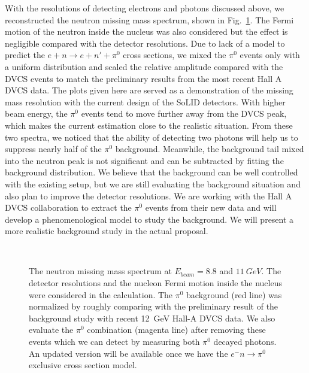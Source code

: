 With the resolutions of detecting electrons and photons discussed above, we reconstructed the neutron missing mass spectrum, shown in Fig.~\ref{missingmass}. The Fermi motion of the neutron inside the nucleus was also considered but the effect is negligible compared with the detector resolutions. Due to lack of a model to predict the $e+n\rightarrow e+n'+\pi^{0}$ cross sections, we mixed the $\pi^{0}$ events only with a uniform distribution and scaled the relative amplitude compared with the DVCS events to match the preliminary results from the most recent Hall A DVCS data. The plots given here are served as a demonstration of the missing mass resolution with the current design of the SoLID detectors. With higher beam energy, the $\pi^{0}$ events tend to move further away from the DVCS peak, which makes the current estimation close to the realistic situation. From these two spectra, we noticed that the ability of detecting two photons will help us to suppress nearly half of the $\pi^{0}$ background. Meanwhile, the background tail mixed into the neutron peak is not significant and can be subtracted by fitting the background distribution. We believe that the background can be well controlled with the existing setup, but we are still evaluating the background situation and also plan to improve the detector resolutions. We are working with the Hall A DVCS collaboration to extract the $\pi^{0}$ events from their new data and will develop a phenomenological model to study the background. We will present a more realistic background study in the actual proposal.
\begin{figure}[!ht]
  \begin{center}
     \\
  \caption[The neutron missing mass spectrum at $E_{beam}=8.8$ and $11~GeV$]{\footnotesize{The neutron missing mass spectrum at $E_{beam}= 8.8$ and $11~GeV$. The detector resolutions and the nucleon Fermi motion inside the nucleus were considered in the calculation. The $\pi^{0}$ background (red line) was normalized by roughly comparing with the preliminary result of the background study with recent 12~GeV Hall-A DVCS data. We also evaluate the $\pi^{0}$ combination (magenta line) after removing these events which we can detect by measuring both $\pi^{0}$ decayed photons. An updated version will be available once we have the $e^{-}n\rightarrow\pi^{0}$ exclusive cross section model.}}
    \label{missingmass}
  \end{center}
\end{figure}

